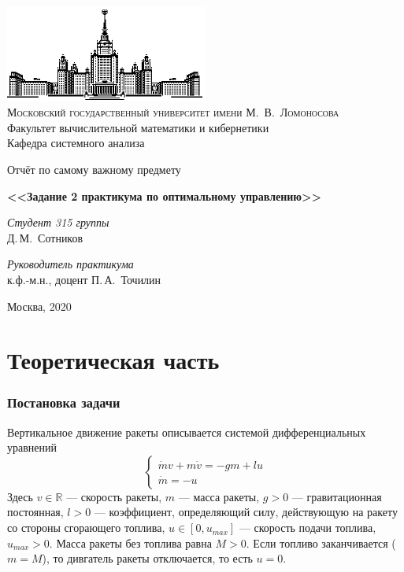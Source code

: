 \documentclass[16pt]{article}
\newcommand\Real{\mathbb{R}}
\begin{document}
\thispagestyle{empty}

\begin{center}
\ \vspace{-3cm}

\includegraphics[width=0.5\textwidth]{msu.eps}\\
{\scshape Московский государственный университет имени М.~В.~Ломоносова}\\
Факультет вычислительной математики и кибернетики\\
Кафедра системного анализа

\vfill

{\LARGE Отчёт по самому важному предмету}

\vspace{1cm}

{\Huge\bfseries <<Задание 2 практикума по оптимальному управлению>>}
\end{center}

\vspace{1cm}

\begin{flushright}
  \large
  \textit{Студент 315 группы}\\
  Д.\,М.~Сотников

  \vspace{5mm}

  \textit{Руководитель практикума}\\
  к.ф.-м.н., доцент П.\,А.~Точилин
\end{flushright}

\vfill

\begin{center}
Москва, 2020
\end{center}

\newpage
\tableofcontents
\newpage
\part{Теоретическая часть}
\section{Постановка задачи}
Вертикальное движение ракеты описывается системой дифференциальных уравнений
\begin{equation}
\begin{cases} \label{task_ode}
\dot{m}v + m\dot{v} = -gm + lu \\
\dot{m} = -u
\end{cases}
\end{equation}
Здесь $v \in \Real$ --- скорость ракеты, $m$ --- масса ракеты, $g > 0$ --- гравитационная постоянная,
$l > 0$ --- коэффициент, определяющий силу, действующую на ракету со стороны сгорающего топлива,
$u \in [0, u_{max}]$ --- скорость подачи топлива, $u_{max} > 0$. Масса ракеты без топлива равна $M > 0$.
Если топливо заканчивается ($m = M$), то дивгатель ракеты отключается, то есть $u = 0$.
\end{document}
